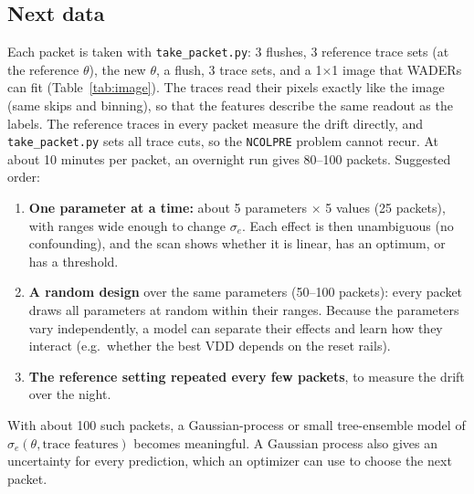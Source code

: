 \documentclass[10pt]{article}
\newcommand{\code}[1]{\texttt{#1}}
\begin{document}
\subsection{Next data}

Each packet is taken with \code{take\_packet.py}: 3 flushes, 3 reference trace sets (at the reference $\theta$), the new
$\theta$, a flush, 3 trace sets, and a 1$\times$1 image that WADERs can fit (Table~\ref{tab:image}). The traces read their pixels exactly like the image (same skips and binning), so that the features describe the same readout as the labels. The reference traces in
every packet measure the drift directly, and \code{take\_packet.py} sets all trace cuts, so the \code{NCOLPRE} problem cannot
recur. At about 10 minutes per packet, an overnight run gives 80--100 packets. Suggested order:
\begin{enumerate}
\item \textbf{One parameter at a time:} about 5 parameters $\times$ 5 values (25 packets), with ranges wide enough to change
  $\sigma_e$. Each effect is then unambiguous (no confounding), and the scan shows whether it is linear, has an optimum, or
  has a threshold.
\item \textbf{A random design} over the same parameters (50--100 packets): every packet draws all parameters at random within
  their ranges. Because the parameters vary independently, a model can separate their effects and learn how they interact
  (e.g.\ whether the best VDD depends on the reset rails).
\item \textbf{The reference setting repeated every few packets}, to measure the drift over the night.
\end{enumerate}
With about 100 such packets, a Gaussian-process or small tree-ensemble model of $\sigma_e(\theta, \text{trace features})$
becomes meaningful. A Gaussian process also gives an uncertainty for every prediction, which an optimizer can use to choose
the next packet.
\end{document}
